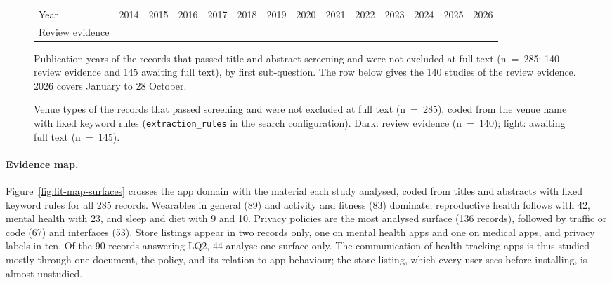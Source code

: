 \begin{figure}[tbp]
\centering

\par\smallskip
{\scriptsize\setlength{\tabcolsep}{3.1pt}
\begin{tabular}{@{}l*{13}{r}@{}}
Year & 2014 & 2015 & 2016 & 2017 & 2018 & 2019 & 2020 & 2021 & 2022 & 2023 & 2024 & 2025 & 2026 \\
Review evidence & 
\end{tabular}}
\caption[Publication years of the screened literature]{Publication years of the
records that passed title-and-abstract screening and were not excluded at full
text (n~=~285: 140 review evidence and 145 awaiting full text), by first
sub-question. The row below gives the 140 studies of the review evidence. 2026
covers January to 28 October.}
\label{fig:lit-years}
\end{figure}

\begin{figure}[tbp]
\centering

\caption[Venue types of the screened literature]{Venue types of the records that
passed screening and were not excluded at full text (n~=~285), coded from the
venue name with fixed keyword rules (\texttt{extraction\_rules} in the search
configuration). Dark: review evidence (n~=~140); light: awaiting full text
(n~=~145).}
\label{fig:lit-venues}
\end{figure}

\paragraph{Evidence map.} Figure~\ref{fig:lit-map-surfaces} crosses the app
domain with the material each study analysed, coded from titles and abstracts
with fixed keyword rules for all 285 records. Wearables in general (89) and
activity and fitness (83) dominate; reproductive health follows with 42,
mental health with 23, and sleep and diet with 9 and 10. Privacy policies are
the most analysed surface (136 records), followed by traffic or code (67) and
interfaces (53). Store listings appear in two records only, one on mental
health apps and one on medical apps, and privacy labels in ten. Of the 90
records answering LQ2, 44 analyse one surface only. The communication of health
tracking apps is thus studied mostly through one document, the policy, and its
relation to app behaviour; the store listing, which every user sees before
installing, is almost unstudied.

